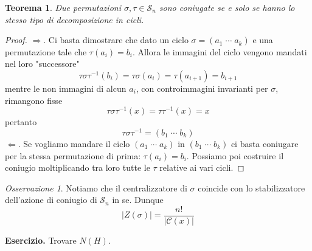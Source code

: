 \documentclass[a4paper]{article}
\newtheorem{theorem}{Teorema}[section]
\theoremstyle{remark}
\newtheorem*{remark}{Osservazione}
\theoremstyle{definition}
\begin{document}
\begin{multicols}{2}
\begin{theorem}
	Due permutazioni $ \sigma, \tau \in \mathcal{S}_n $ sono coniugate se e solo se hanno lo stesso tipo di decomposizione in cicli.
\end{theorem}
\begin{proof}
	$ \Rightarrow  $. Ci basta dimostrare che dato un ciclo $ \sigma = (a_1 \; \cdots \; a_k) $ e una permutazione tale che $ \tau(a_i) = b_i $. Allora le immagini del ciclo vengono mandati nel loro "successore" \[ \tau\sigma\tau^{-1} (b_i) = \tau\sigma(a_i) = \tau(a_{i+1}) = b_{i+1} \] mentre le non immagini di alcun $ a_i $, con controimmagini invarianti per $ \sigma $, rimangono fisse \[ \tau\sigma\tau^{-1} (x) = \tau\tau^{-1}(x) = x \]
	pertanto \[\tau\sigma\tau^{-1} = (b_1 \; \cdots \; b_k) \]
	$ \Leftarrow $. Se vogliamo mandare il ciclo $ (a_1 \; \cdots \; a_k) $ in $ (b_1 \; \cdots \; b_k) $ ci basta coniugare per la stessa permutazione di prima: $ \tau(a_i) = b_i $. Possiamo poi costruire il coniugio moltiplicando tra loro tutte le $ \tau $ relative ai vari cicli.
\end{proof}

\begin{remark}
	Notiamo che il centralizzatore di $ \sigma $ coincide con lo stabilizzatore dell'azione di coniugio di $ \mathcal{S}_n $ in se. Dunque
	\[ |Z(\sigma)| = \frac{n!}{|\mathcal{C}(x)|} \]
\end{remark}
\textbf{Esercizio.} Trovare $ N(H) $.

\end{multicols}
\end{document}

